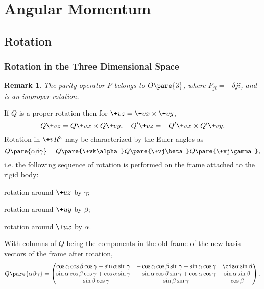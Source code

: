 \documentclass[hidelinks]{article}
\newtheorem{remark}{Remark}
\begin{document}
\section{Angular Momentum} %
\label{sec:angular_momentum}

\subsection{Rotation} %
\label{sub:rotation}

\subsubsection{Rotation in the Three Dimensional Space} %
\label{ssub:rotation_in_the_three_dimensional_space}

\begin{remark}
    The parity operator $P$ belongs to $O\pare{3}$, where $P_{ji} = -\delta{ji}$, and is an improper rotation.
\end{remark}
If $Q$ is a proper rotation then for $\+vz = \+vx\times \+vy$,
\[ Q\+vz = Q\+vx\times Q\+vy,\quad Q'\+vz = -Q'\+vx \times Q' \+vy. \]
Rotation in $\+vR^3$ may be characterized by the Euler angles as
\[ Q\pare{\alpha\beta\gamma} = Q\pare{\+vk\alpha}Q\pare{\+vj\beta}Q\pare{\+vj\gamma}, \]
i.e. the following sequence of rotation is performed on the frame attached to the rigid body:
\begin{cenum}
    \item rotation around $\+uz$ by $\gamma$;
    \item rotation around $\+uy$ by $\beta$;
    \item rotation around $\+ux$ by $\alpha$.
\end{cenum}
With columns of $Q$ being the components in the old frame of the new basis vectors of the frame after rotation,
\[ Q\pare{\alpha\beta\gamma} = \begin{pmatrix}
    \cos\alpha\cos\beta\cos\gamma - \sin\alpha\sin\gamma & -\cos\alpha\cos\beta\sin\gamma - \sin\alpha\cos\gamma & \cis\alpha\sin\beta \\
    \sin\alpha\cos\beta\cos\gamma + \cos\alpha\sin\gamma & -\sin\alpha\cos\beta\sin\gamma + \cos\alpha\cos\gamma & \sin\alpha\sin\beta \\
    -\sin\beta \cos\gamma & \sin\beta\sin\gamma & \cos\beta
\end{pmatrix}. \]

\end{document}

